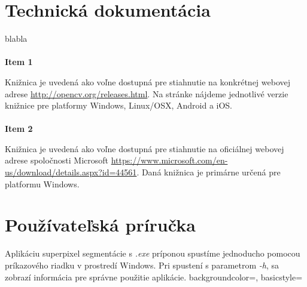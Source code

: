 \newpage
\thispagestyle{plain}
\appendixpagenumbering
\section{Technická dokumentácia}
\lipsum[1] 
blabla \\ \\
{\bf{Item 1}}

Knižnica je uvedená ako voľne dostupná pre stiahnutie na konkrétnej webovej adrese \url{http://opencv.org/releases.html}. Na stránke nájdeme jednotlivé verzie knižnice pre platformy Windows, Linux/OSX, Android a iOS. \\ \\
\noindent
{\bf{Item 2}}

Knižnica je uvedená ako voľne dostupná pre stiahnutie na oficiálnej webovej adrese spoločnosti Microsoft \url{https://www.microsoft.com/en-us/download/details.aspx?id=44561}. Daná knižnica je primárne určená pre platformu Windows.


\newpage
\appendixpagenumbering
\section{Používateľská príručka}
Aplikáciu superpixel segmentácie s \textit{.exe} príponou spustíme jednoducho pomocou príkazového riadku v prostredí Windows. Pri spustení s parametrom \textit{-h}, sa zobrazí informácia pre správne použitie aplikácie.
{
	backgroundcolor=\color{white},
	basicstyle=\scriptsize\color{black}\ttfamily
}

